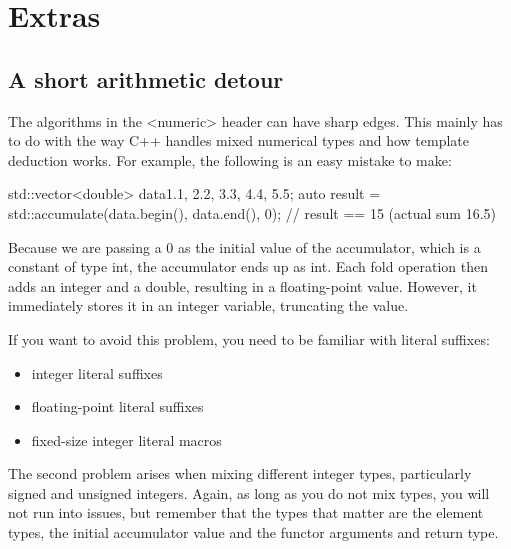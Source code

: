 \chapter{Extras}

\section{A short arithmetic detour}

The algorithms in the <numeric> header can have sharp edges. This mainly has to do with the way C++ handles mixed numerical types and how template deduction works. For example, the following is an easy mistake to make:

\begin{box-note}
\begin{cppcode}
std::vector<double> data{1.1, 2.2, 3.3, 4.4, 5.5};
auto result = std::accumulate(data.begin(), data.end(), 0);
// result == 15 (actual sum 16.5)
\end{cppcode}
\end{box-note}

Because we are passing a 0 as the initial value of the accumulator, which is a constant of type int, the accumulator ends up as int. Each fold operation then adds an integer and a double, resulting in a floating-point value. However, it immediately stores it in an integer variable, truncating the value.

If you want to avoid this problem, you need to be familiar with literal suffixes:

\begin{itemize}
    \item integer literal suffixes
    \item floating-point literal suffixes
    \item fixed-size integer literal macros
\end{itemize}

The second problem arises when mixing different integer types, particularly signed and unsigned integers. Again, as long as you do not mix types, you will not run into issues, but remember that the types that matter are the element types, the initial accumulator value and the functor arguments and return type.


